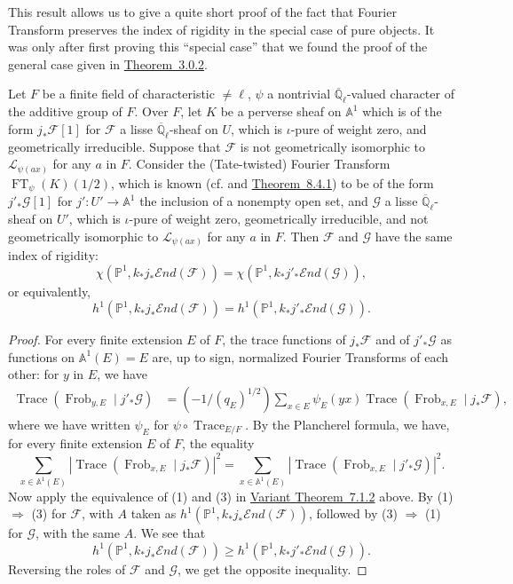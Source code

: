 This result allows us to give a quite short proof of the fact that Fourier Transform preserves the index of rigidity in the special case of pure objects. It was only after first proving this ``special case'' that we found the proof of the general case given in \hyperref[thm:3.0.2]{Theorem~3.0.2}.

Let \(F\) be a finite field of characteristic \(\ne\ell\), \(\psi\) a nontrivial \(\overline{\mathbb{Q}}_\ell\)-valued character of the additive group of \(F\). Over \(F\), let \(K\) be a perverse sheaf on \(\mathbb{A}^1\) which is of the form \(j_*\mathcal{F}[1]\) for \(\mathcal{F}\) a lisse \(\overline{\mathbb{Q}}_\ell\)-sheaf on \(U\), which is \(\iota\)-pure of weight zero, and geometrically irreducible. Suppose that \(\mathcal{F}\) is not geometrically isomorphic to \(\mathcal{L}_{\psi(ax)}\) for any \(a\) in \(F\). Consider the (Tate-twisted) Fourier Transform \(\operatorname{FT}_\psi(K)(1/2)\), which is known (cf. \cite[6.2.5]{Ka-GKM} and \hyperref[thm:8.4.1]{Theorem~8.4.1}) to be of the form \(j'_* \mathcal{G}[1]\) for \(j':U'\to\mathbb{A}^1\) the inclusion of a nonempty open set, and \(\mathcal{G}\) a lisse \(\overline{\mathbb{Q}}_\ell\)-sheaf on \(U'\), which is \(\iota\)-pure of weight zero, geometrically irreducible, and not geometrically isomorphic to \(\mathcal{L}_{\psi(ax)}\) for any \(a\) in \(F\). Then \(\mathcal{F}\) and \(\mathcal{G}\) have the same index of rigidity:
\[
\chi(\mathbb{P}^1,k_*j_*\mathcal{E}nd(\mathcal{F}))=\chi(\mathbb{P}^1,k_*j'_*\mathcal{E}nd(\mathcal{G})),
\]
or equivalently,
\[
h^1(\mathbb{P}^1,k_*j_*\mathcal{E}nd(\mathcal{F}))=h^1(\mathbb{P}^1,k_*j'_*\mathcal{E}nd(\mathcal{G})).
\]
\begin{proof}
For every finite extension \(E\) of \(F\), the trace functions of \(j_*\mathcal{F}\) and of \(j'_*\mathcal{G}\) as functions on \(\mathbb{A}^1(E)=E\) are, up to sign, normalized Fourier Transforms of each other: for \(y\) in \(E\), we have
\[
\begin{aligned}
\operatorname{Trace}(\operatorname{Frob}_{y,E}\mid j'_*\mathcal{G})
&=(-1/(q_E)^{1/2})\sum_{x\in E}\psi_E(yx)\operatorname{Trace}(\operatorname{Frob}_{x,E}\mid j_*\mathcal{F}),
\end{aligned}
\]
where we have written \(\psi_E\) for \(\psi\circ\operatorname{Trace}_{E/F}\). By the Plancherel formula, we have, for every finite extension \(E\) of \(F\), the equality
\[
\sum_{x\in\mathbb{A}^1(E)}|\operatorname{Trace}(\operatorname{Frob}_{x,E}\mid j_*\mathcal{F})|^2
=\sum_{x\in\mathbb{A}^1(E)}|\operatorname{Trace}(\operatorname{Frob}_{x,E}\mid j'_*\mathcal{G})|^2.
\]
Now apply the equivalence of (1) and (3) in \hyperref[thm:7.1.2]{Variant Theorem~7.1.2} above. By (1) \(\Rightarrow\) (3) for \(\mathcal{F}\), with \(A\) taken as \(h^1(\mathbb{P}^1,k_*j_*\mathcal{E}nd(\mathcal{F}))\), followed by (3) \(\Rightarrow\) (1) for \(\mathcal{G}\), with the same \(A\). We see that
\[
h^1(\mathbb{P}^1,k_*j_*\mathcal{E}nd(\mathcal{F}))\geq h^1(\mathbb{P}^1,k_*j'_*\mathcal{E}nd(\mathcal{G})).
\]
Reversing the roles of \(\mathcal{F}\) and \(\mathcal{G}\), we get the opposite inequality.
\end{proof}

